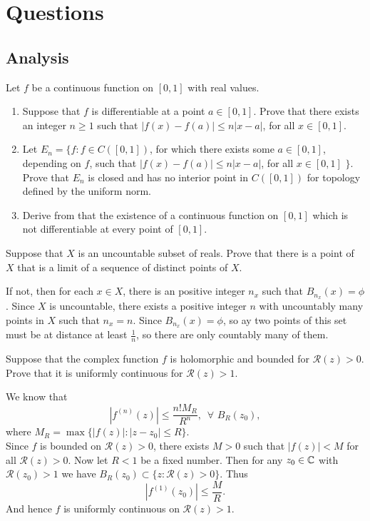 \section{Questions}
\subsection{Analysis}
    \question Let $f$ be a continuous function on $[0,1]$ with real values.
\begin{enumerate}
    \item Suppose that $f$ is differentiable at a point $a\in [0, 1]$. Prove that there exists an integer $n\geq 1$ such that $|f(x)-f(a)|\leq n|x-a|$, for all $x\in [0, 1]$.
    \item Let $E_n=\{f: f\in C([0, 1])$, for which there exists some $a\in [0, 1]$, depending on $f$, such that $|f(x)-f(a)|\leq n|x-a|$, for all $x\in [0, 1]$ $\}$. Prove that $E_n$ is closed and has no interior point in $C([0, 1])$ for topology defined by the uniform norm.
    \item Derive from that the existence of a continuous function on $[0, 1]$ which is not differentiable at every point of $[0, 1]$.
\end{enumerate}

\begin{solution}
    
\end{solution}

\question Suppose that $X$ is an uncountable subset of reals. Prove that there is a point of $X$ that is a limit of a sequence of distinct points of $X$.

\begin{solution}
    If not, then for each $x\in X$, there is an positive integer $n_x$ such that $B_{n_x}(x)=\phi$. Since $X$ is uncountable, there exists a positive integer $n$ with uncountably many points in $X$ such that $n_x=n$. Since $B_{n_x}(x)=\phi$, so ay two points of this set must be at distance at least $\frac{1}{n}$, so there are only countably many of them.
\end{solution}

\question Suppose that the complex function $f$ is holomorphic and bounded for $\mathcal{R}(z)>0$. Prove that it is uniformly continuous for $\mathcal{R}(z)>1$.

\begin{solution}
    We know that $$|f^{(n)}(z)|\leq\frac{{n!}M_R}{R^n},\,\,\, \forall \,\, B_R{(z_0)},$$ where $M_R=\max\{|f(z)|: |z-z_0|\leq R\}$.\\
    Since $f$ is bounded on $\mathcal{R}(z)>0$, there exists $M>0$ such that $|f(z)|<M$ for all $\mathcal{R}(z)>0$. Now let $R<1$ be a fixed number. Then for any $z_0\in\mathbb{C}$ with $\mathcal{R}(z_0)>1$ we have $B_R(z_0)\subset\{z: \mathcal{R}(z)>0\}$. Thus
    $$|f^{(1)}(z_0)|\leq\frac{M}{R}.$$ And hence $f$ is uniformly continuous on $\mathcal{R}(z)>1$.
\end{solution}

